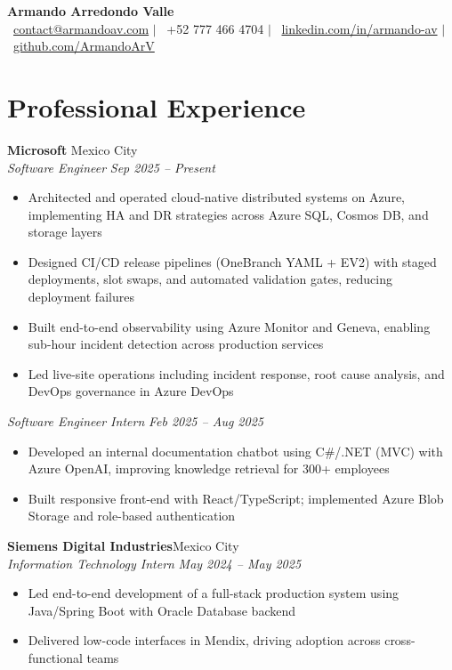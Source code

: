 \documentclass[10pt,a4paper]{article}
\begin{document}
\begin{center}
    {\LARGE\bfseries\color{navy} Armando Arredondo Valle}\\[4pt]
    \small
    \faEnvelope\ \href{mailto:contact@armandoav.com}{contact@armandoav.com} $\vert$
    \faPhone\ +52 777 466 4704 $\vert$
    \faLinkedin\ \href{https://www.linkedin.com/in/armando-av}{linkedin.com/in/armando-av} $\vert$
    \faGithub\ \href{https://github.com/ArmandoArV}{github.com/ArmandoArV}
\end{center}

\section*{Professional Experience}

\textbf{Microsoft} \hfill Mexico City\\[1pt]
\textit{Software Engineer} \hfill \textit{Sep 2025 -- Present}
\begin{itemize}
    \item Architected and operated cloud-native distributed systems on Azure, implementing HA and DR strategies across Azure SQL, Cosmos DB, and storage layers
    \item Designed CI/CD release pipelines (OneBranch YAML + EV2) with staged deployments, slot swaps, and automated validation gates, reducing deployment failures
    \item Built end-to-end observability using Azure Monitor and Geneva, enabling sub-hour incident detection across production services
    \item Led live-site operations including incident response, root cause analysis, and DevOps governance in Azure DevOps
\end{itemize}
\textit{Software Engineer Intern} \hfill \textit{Feb 2025 -- Aug 2025}
\begin{itemize}
    \item Developed an internal documentation chatbot using C\#/.NET (MVC) with Azure OpenAI, improving knowledge retrieval for 300+ employees
    \item Built responsive front-end with React/TypeScript; implemented Azure Blob Storage and role-based authentication
\end{itemize}

\vspace{1pt}
\textbf{Siemens Digital Industries}\hfill Mexico City\\[1pt]
\textit{Information Technology Intern} \hfill \textit{May 2024 -- May 2025}
\begin{itemize}
    \item Led end-to-end development of a full-stack production system using Java/Spring Boot with Oracle Database backend
    \item Delivered low-code interfaces in Mendix, driving adoption across cross-functional teams
\end{itemize}
\end{document}
